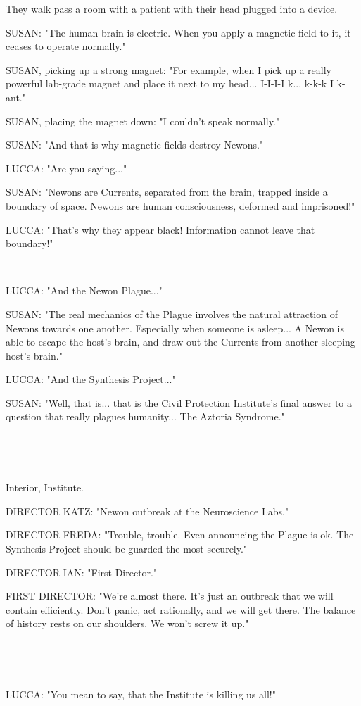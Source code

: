 \documentclass[11pt]{article}
\begin{document}
They walk pass a room with a patient with their head plugged into a device.

SUSAN: "The human brain is electric.
When you apply a magnetic field to it, it ceases to operate normally."

SUSAN, picking up a strong magnet: "For example, when I pick up a really powerful lab-grade magnet and place it next to my head...
I-I-I-I k... k-k-k I k-ant."

SUSAN, placing the magnet down: "I couldn't speak normally."

SUSAN: "And that is why magnetic fields destroy Newons."

LUCCA: "Are you saying..."

SUSAN: "Newons are Currents, separated from the brain, trapped inside a boundary of space.
Newons are human consciousness, deformed and imprisoned!"

LUCCA: "That's why they appear black! 
Information cannot leave that boundary!"

\ 

LUCCA: "And the Newon Plague..."

SUSAN: "The real mechanics of the Plague involves the natural attraction of Newons towards one another.
Especially when someone is asleep...
A Newon is able to escape the host's brain, and draw out the Currents from another sleeping host's brain."

LUCCA: "And the Synthesis Project..."

SUSAN: "Well, that is...
that is the Civil Protection Institute's final answer to a question that really plagues humanity...
The Aztoria Syndrome."

\ 

\ 

Interior, Institute.

DIRECTOR KATZ: "Newon outbreak at the Neuroscience Labs."

DIRECTOR FREDA: "Trouble, trouble.
Even announcing the Plague is ok.
The Synthesis Project should be guarded the most securely."

DIRECTOR IAN: "First Director."

FIRST DIRECTOR: "We're almost there.
It's just an outbreak that we will contain efficiently.
Don't panic, act rationally, and we will get there.
The balance of history rests on our shoulders.
We won't screw it up."

\ 

\ 

LUCCA: "You mean to say, that the Institute is killing us all!"
\end{document}
